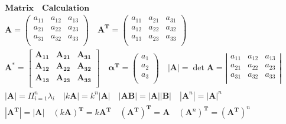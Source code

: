 \documentclass{article}
\begin{document}
\clearpage

\begin{align*}
    \bm{Matrix \quad Calculation} \\  
    \mathbf{A} = \left(
        \begin{array}{ccc}
            a_{11} & a_{12} & a_{13} \\ 
            a_{21} & a_{22} & a_{23} \\ 
            a_{31} & a_{32} & a_{33} \\  
        \end{array}
    \right) \quad \mathbf{A^{T}} = \left(
        \begin{array}{ccc}
            a_{11} & a_{21} & a_{31} \\ 
            a_{12} & a_{22} & a_{32} \\ 
            a_{13} & a_{23} & a_{33} \\  
        \end{array}
    \right) \\
    \mathbf{A^{*}} = \begin{bmatrix} 
        \mathbf{A_{11}} & \mathbf{A_{21}} & \mathbf{A_{31}} \\ 
        \mathbf{A_{12}} & \mathbf{A_{22}} & \mathbf{A_{32}} \\ 
        \mathbf{A_{13}} & \mathbf{A_{23}} & \mathbf{A_{33}} \\  
    \end{bmatrix} 
    \quad 
    \mathbf{\alpha^{T}} = \left(
        \begin{array}{c}
            a_{1} \\
            a_{2} \\  
            a_{3} \\ 
         \end{array}
    \right) \quad 
    |\mathbf{A}| =\det \mathbf{A} = \left|
    \begin{array}{ccc}
        a_{11} & a_{12} & a_{13} \\ 
        a_{21} & a_{22} & a_{23} \\ 
        a_{31} & a_{32} & a_{33} \\  
    \end{array}
    \right| \\ 
    |\mathbf{A}| = \Pi_{i=1}^n{\lambda_{i}} \quad |k \mathbf{A}| = k^{n}|\mathbf{A}| \quad |\mathbf{A}\mathbf{B}|=|\mathbf{A}||\mathbf{B}| \quad |\mathbf{A}^{n}|=|\mathbf{A}|^{n}\\
    |\mathbf{A}^{\mathbf{T}}| = |\mathbf{A}| \quad (k\mathbf{A})^{\mathbf{T}} = k\mathbf{A}^{\mathbf{T}} \quad (\mathbf{A}^{\mathbf{T}})^{\mathbf{T}} = \mathbf{A} \quad (\mathbf{A}^{n})^{\mathbf{T}} = (\mathbf{A}^{\mathbf{T}})^{n}\\  

\end{align*}
\end{document}
